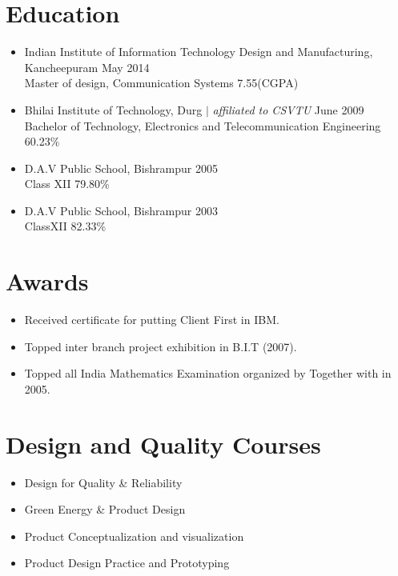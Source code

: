 \documentclass[letterpaper, 12 pt]{article}
\begin{document}
			\section{Education}
				\begin{itemize}[noitemsep]
					\item {{Indian Institute of Information Technology Design and Manufacturing, Kancheepuram} \hfill {May 2014}\\{Master of design, Communication Systems} \hfill {7.55(CGPA)}} 
					\item {Bhilai Institute of Technology, Durg $|$ \textit{affiliated to CSVTU}} \hfill {June 2009}\\{Bachelor of Technology, Electronics and Telecommunication Engineering} \hfill {60.23\%}
					\item  {{D.A.V Public School, Bishrampur} \hfill {2005}\\{Class XII} \hfill {79.80\%}}
					\item {{D.A.V Public School, Bishrampur} \hfill {2003}\\ {ClassXII} \hfill {82.33\%}}		
					
				\end{itemize}
			\section{Awards}
				\begin{itemize}[noitemsep]
					\item {Received certificate for putting Client First in IBM.}
					\item {Topped inter branch project exhibition in B.I.T (2007).}
					\item {Topped all India Mathematics Examination organized by Together with in 2005.}
				\end{itemize}
		
		\section{Design and Quality Courses}
			\begin{itemize}[noitemsep]
				\item Design for Quality \& Reliability
				\item Green Energy \& Product Design
				\item Product Conceptualization and visualization
				\item Product Design Practice and Prototyping
				
			\end{itemize}
				

		
\end{document}
